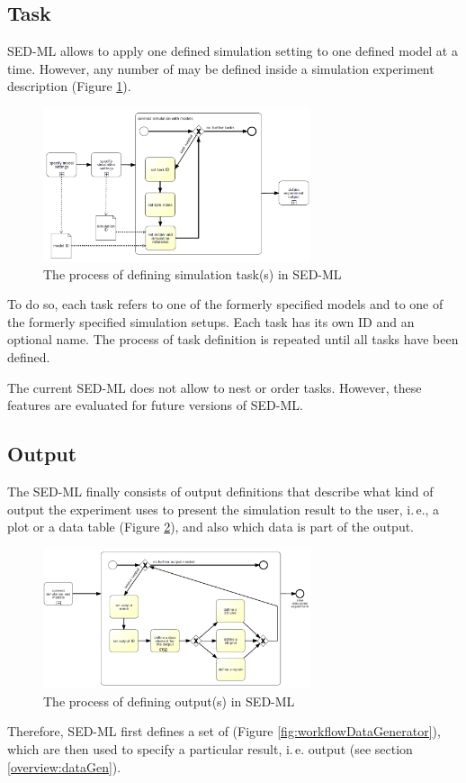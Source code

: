 \subsection{Task}
\label{overview:task}
SED-ML allows to apply one defined simulation setting to one defined model at a time. However, any number of  may be defined inside a simulation experiment description (Figure \ref{fig:workflowTask}). 
%
\begin{figure}[h]
\centering
\includegraphics[width=0.7\textwidth]{images/bpmn/sedTaskOryx.png}
\caption{The process of defining simulation task(s) in SED-ML}
\label{fig:workflowTask}
\end{figure}
%
To do so, each task refers to one of the formerly specified models and to one of the formerly specified simulation setups. Each task has its own ID and an optional name. The process of task definition is repeated until all tasks have been defined.


The current SED-ML does not allow to nest or order tasks. However, these features are evaluated for future versions of SED-ML.

\subsection{Output}
\label{overview:output}
The SED-ML finally consists of output definitions that describe what kind of output the experiment uses to present the simulation result to the user, i.\,e., a plot or a data table (Figure \ref{fig:workflowOutput}), and also which data is part of the output. 
%
\begin{figure}[h]
\centering
\includegraphics[width=0.7\textwidth]{images/bpmn/sedOutputOryx.png}
\caption{The process of defining output(s) in SED-ML}
\label{fig:workflowOutput}
\end{figure}
%
Therefore, SED-ML first defines a set of  (Figure \ref{fig:workflowDataGenerator}), which are then used to specify a particular result, i.\,e. output (see section \ref{overview:dataGen}). 

